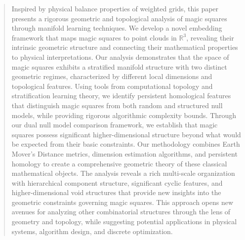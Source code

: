 \begin{abstract}
Inspired by physical balance properties of weighted grids, this paper presents a rigorous geometric and topological analysis of magic squares through manifold learning techniques. We develop a novel embedding framework that maps magic squares to point clouds in $\mathbb{R}^3$, revealing their intrinsic geometric structure and connecting their mathematical properties to physical interpretations. Our analysis demonstrates that the space of magic squares exhibits a stratified manifold structure with two distinct geometric regimes, characterized by different local dimensions and topological features. Using tools from computational topology and stratification learning theory, we identify persistent homological features that distinguish magic squares from both random and structured null models, while providing rigorous algorithmic complexity bounds. Through our dual null model comparison framework, we establish that magic squares possess significant higher-dimensional structure beyond what would be expected from their basic constraints. Our methodology combines Earth Mover's Distance metrics, dimension estimation algorithms, and persistent homology to create a comprehensive geometric theory of these classical mathematical objects. The analysis reveals a rich multi-scale organization with hierarchical component structure, significant cyclic features, and higher-dimensional void structures that provide new insights into the geometric constraints governing magic squares. This approach opens new avenues for analyzing other combinatorial structures through the lens of geometry and topology, while suggesting potential applications in physical systems, algorithm design, and discrete optimization.
\end{abstract} 